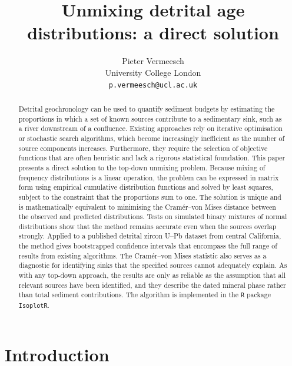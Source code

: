 \documentclass{article}
\title{Unmixing detrital age distributions: a direct solution}
\author{Pieter Vermeesch\\University College London\\\texttt{p.vermeesch@ucl.ac.uk}}
\begin{document}
\linenumbers
\maketitle

\begin{abstract}
Detrital geochronology can be used to quantify sediment budgets by
estimating the proportions in which a set of known sources contribute
to a sedimentary sink, such as a river downstream of a
confluence. Existing approaches rely on iterative optimisation or
stochastic search algorithms, which become increasingly inefficient as
the number of source components increases. Furthermore, they require
the selection of objective functions that are often heuristic and lack
a rigorous statistical foundation. This paper presents a direct
solution to the top-down unmixing problem. Because mixing of frequency
distributions is a linear operation, the problem can be expressed in
matrix form using empirical cumulative distribution functions and
solved by least squares, subject to the constraint that the
proportions sum to one. The solution is unique and is mathematically
equivalent to minimising the Cram\'{e}r--von Mises distance between
the observed and predicted distributions. Tests on simulated binary
mixtures of normal distributions show that the method remains accurate
even when the sources overlap strongly. Applied to a published
detrital zircon U--Pb dataset from central California, the method
gives bootstrapped confidence intervals that encompass the full range
of results from existing algorithms. The Cram\'{e}r--von Mises
statistic also serves as a diagnostic for identifying sinks that the
specified sources cannot adequately explain. As with any top-down
approach, the results are only as reliable as the assumption that all
relevant sources have been identified, and they describe the dated
mineral phase rather than total sediment contributions. The algorithm
is implemented in the \texttt{R} package \texttt{IsoplotR}.
\end{abstract}

\section{Introduction}\label{sec:intro}
\end{document}
